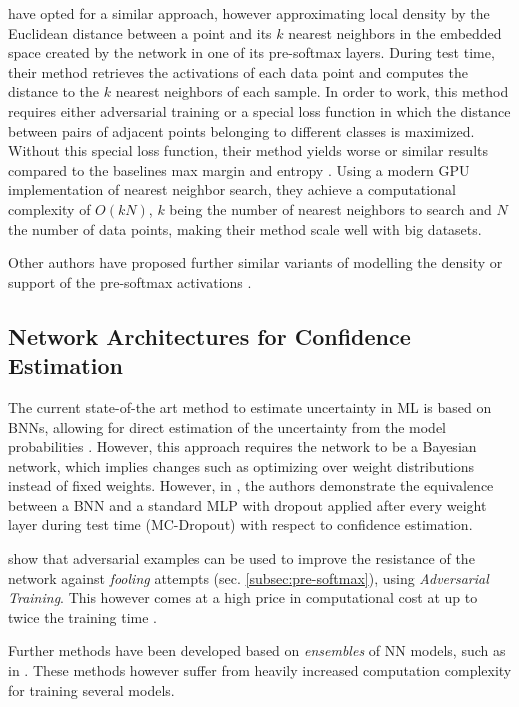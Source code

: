 \documentclass[10pt]{article}
\begin{document}
\textcite{mandelbaum17} have opted for a similar approach, however approximating local density by the Euclidean distance between a point and its $k$ nearest neighbors in the embedded space created by the network in one of its pre-softmax layers. During test time, their method retrieves the activations of each data point and computes the distance to the $k$ nearest neighbors of each sample. In order to work, this method requires either adversarial training or a special loss function in which the distance between pairs of adjacent points belonging to different classes is maximized. Without this special loss function, their method yields worse or similar results compared to the baselines max margin and entropy \cite{mandelbaum17}. Using a modern \acrshort{GPU} implementation of nearest neighbor search, they achieve a computational complexity of $O(kN)$, $k$ being the number of nearest neighbors to search and $N$ the number of data points, making their method scale well with big datasets.

Other authors have proposed further similar variants of modelling the density or support of the pre-softmax activations \textcite{Bishop1994NoveltyDA}.

\subsection{Network Architectures for Confidence Estimation}
The current state-of-the art method to estimate uncertainty in \gls{ML} is based on \glspl{BNN}, allowing for direct estimation of the uncertainty from the model probabilities \cite{Gal2015Dropout,ghahramani,KendallG17}. However, this approach requires the network to be a Bayesian network, which implies changes such as optimizing over weight distributions instead of fixed weights. However, in \textcite{Gal2015Dropout, ghahramani}, the authors demonstrate the equivalence between a \gls{BNN} and a standard \gls{MLP} with dropout applied after every weight layer during test time (\gls{MC-Dropout}) with respect to confidence estimation.

\textcite{Goodfellow2014} show that adversarial examples can be used to improve the resistance of the network against \textit{fooling} attempts (sec. \ref{subsec:pre-softmax}), using \textit{Adversarial Training}. This however comes at a high price in computational cost at up to twice the training time \cite{mandelbaum17}.

Further methods have been developed based on \textit{ensembles} of NN models, such as in \textcite{Lakshminarayanan16, mandelbaum17}. These methods however suffer from heavily increased computation complexity for training several models.
\end{document}
